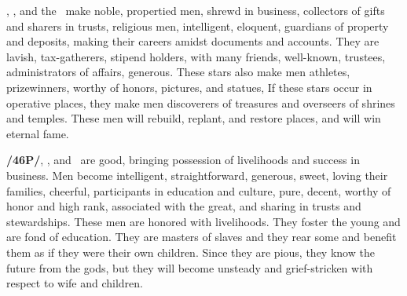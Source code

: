 \Jupiter, \Mercury, and the \Moon\, make noble, propertied men, shrewd in business, collectors of gifts and sharers in trusts, religious men, intelligent, eloquent, guardians of property and deposits, making their careers amidst documents and accounts. They are lavish, tax-gatherers, stipend holders, with many friends, well-known, trustees, administrators of affairs, generous. These stars also make men athletes, prizewinners, worthy of honors, pictures, and statues, If these stars occur in operative places, they make men discoverers of treasures and overseers of shrines and temples. These men will rebuild, replant, and restore places, and will win eternal fame.

\textbf{/46P/}\Jupiter, \Mercury, and \Venus\, are good, bringing possession of livelihoods and success in business. Men become intelligent, straightforward, generous, sweet, loving their families, cheerful, participants in education and culture, pure, decent, worthy of honor and high rank, associated with the great, and sharing in trusts and stewardships. These men are honored with livelihoods. They foster the young and are fond of education. They are masters of slaves and they rear some and benefit them as if they were their own children. Since they are pious, they know the future from the gods, but they will become unsteady and grief-stricken with respect to wife and children.

